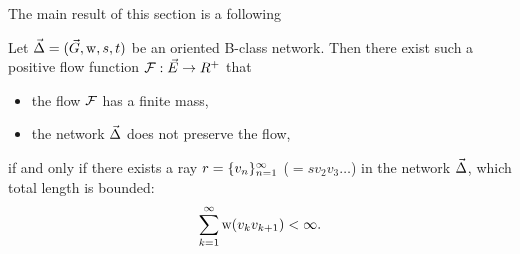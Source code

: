 \documentclass[12pt]{article}
\begin{document}
    The main result of this section is a following
    \begin{theorem}
      \label{ray-thm}
      Let $\vec{\Delta} = (\vec{G}, \mathrm{w}, s, t)$ be an oriented B-class network.
      Then there exist such a positive flow function $\mathcal{F}: \vec{E} \to R^{+}$ that
      \begin{itemize}
        \item the flow $\mathcal{F}$ has a finite mass,
        \item the network $\vec{\Delta}$ does not preserve the flow,
      \end{itemize}
        if and only if there exists a ray $r = \{{v}_n\}_{n=1}^\infty$ ($=sv_2v_3\dots$)
        in the network $\vec{\Delta}$, which total length is bounded:
        \[
          \sum_{k=1}^\infty \mathrm{w}(v_k v_{k+1}) < \infty.
        \]
    \end{theorem}
\end{document}
